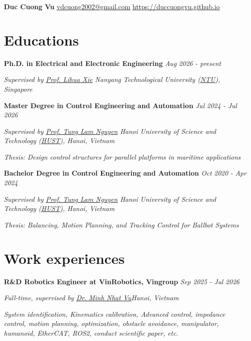 \documentclass[10pt]{extarticle}
\let\oldhref\href
\renewcommand{\href}[2]{\oldhref{#1}{\ul{#2}}}
\newcommand{\name}[3]{%
	\huge
	\fontfamily{phv}\selectfont
	\textbf{#1}%
	\normalsize\normalfont \hfill #2 \quad #3
}
\newcommand{\work}[4]{%
	\noindent \textbf{#1} \hfill \textit{#2}\par
	\vspace{0.3em}
	\noindent \textit{#3}\par
	\vspace{0.3em}
	\noindent \textit{#4}\par
	\normalsize
}
\begin{document}
	
	
	\name{Duc Cuong Vu}{\href{mailto:vdcuong2002@gmail.com}{vdcuong2002@gmail.com}}{\href{https://duccuongvu.github.io}{https://duccuongvu.github.io}}
	

	
	\vspace{0.5em}\par
	
	
	\section*{Educations}

	\work{Ph.D. in Electrical and Electronic Engineering}
	{Aug 2026 - present}
	{\textit{Supervised by \href{https://scholar.google.com/citations?user=Fmrv3J8AAAAJ&hl=en}{\textit{Prof. Lihua Xie}}} \hfill {Nanyang Technological University (\href{https://www.ntu.edu.sg/}{NTU})}, Singapore}
	{}

	\work{Master Degree in Control Engineering and Automation}
	{Jul 2024 - Jul 2026}
	{\textit{Supervised by \href{https://scholar.google.com/citations?user=MlJ_2-wAAAAJ&hl=en}{\textit{Prof. Tung Lam Nguyen}}} \hfill Hanoi University of Science and Technology (\href{https://hust.edu.vn/en/}{HUST}), Hanoi, Vietnam}
	{Thesis: Design control structures for parallel platforms in maritime applications}

	\work{Bachelor Degree in Control Engineering and Automation}
	{Oct 2020 - Apr 2024}
	{\textit{Supervised by \href{https://scholar.google.com/citations?user=MlJ_2-wAAAAJ&hl=en}{\textit{Prof. Tung Lam Nguyen}}} \hfill Hanoi University of Science and Technology (\href{https://hust.edu.vn/en/}{HUST}), Hanoi, Vietnam}
	{Thesis: Balancing, Motion Planning, and Tracking Control for Ballbot Systems}
	
		
	\section*{Work experiences}
	\work{R\&D Robotics Engineer at VinRobotics, Vingroup}
	{Sep 2025 - Jul 2026}
	{Full-time, supervised by \href{https://scholar.google.com/citations?user=qyExc4QAAAAJ&hl=en}{\textit{Dr. Minh Nhat Vu}}\hfill Hanoi, Vietnam}
	{System identification, Kinematics calibration, Advanced control, impedance control, motion planning, optimization, obstacle avoidance, manipulator, humanoid, EtherCAT, ROS2, conduct scientific paper, etc.}
	
\end{document}
